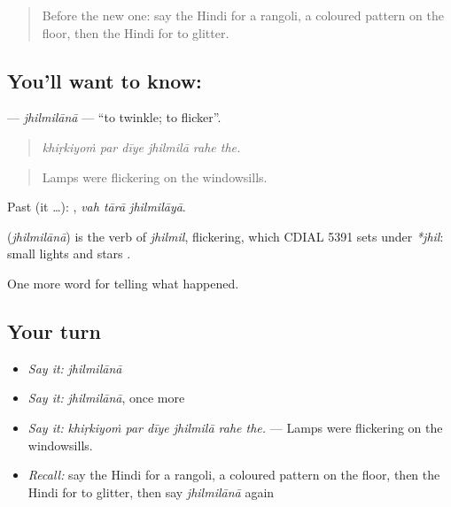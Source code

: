 \label{lesson:HI-C328-jhilmilana}



\begin{quote}
Before the new one: say the Hindi for a rangoli, a coloured pattern on the floor, then the Hindi for to glitter.
\end{quote}

\subsection*{You'll want to know: }
\textbf{} — \emph{jhilmilānā} — \textquotedblleft{}to twinkle; to flicker\textquotedblright{}.

\begin{quote}
     
\end{quote}

\begin{quote}
\emph{khiṛkiyoṁ par dīye jhilmilā rahe the.}
\end{quote}

\begin{quote}
Lamps were flickering on the windowsills.
\end{quote}

Past (it …):   , \emph{vah tārā jhilmilāyā}.

\begin{cousinweb}
\textbf{} (\emph{jhilmilānā}) is the verb of \emph{jhilmil}, flickering, which CDIAL 5391 sets under \emph{*jhil}: small lights and stars \textbf{ }.
\end{cousinweb}

\begin{grammarlens}[title={What you've built}]
One more word for telling what happened.
\end{grammarlens}

\subsection*{Your turn}
\begin{itemize}
\raggedright
  \item \emph{Say it:} \emph{jhilmilānā}
  \item \emph{Say it:} \emph{jhilmilānā}, once more
  \item \emph{Say it:} \emph{khiṛkiyoṁ par dīye jhilmilā rahe the.} — Lamps were flickering on the windowsills.
  \item \emph{Recall:} say the Hindi for a rangoli, a coloured pattern on the floor, then the Hindi for to glitter, then say \emph{jhilmilānā} again
\end{itemize}

